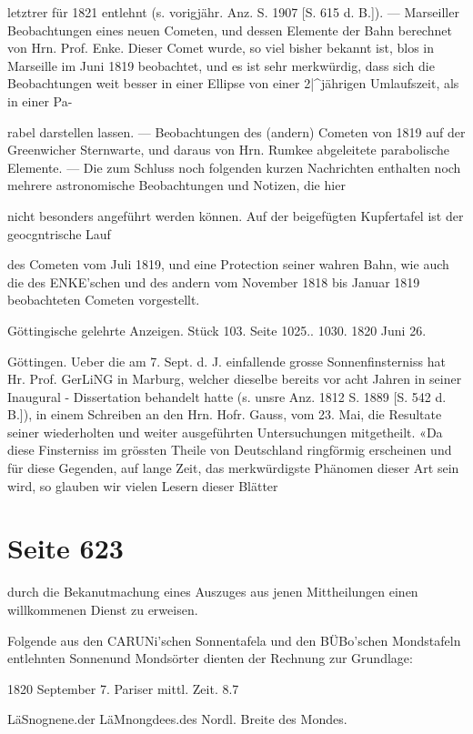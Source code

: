 \documentclass[10pt,a4paper]{article}
\begin{document}
letztrer für 1821 entlehnt (s. vorigjähr. Anz. S. 1907 [S. 615 d. B.]). — Marseiller Beobachtungen eines neuen Cometen, und dessen Elemente der Bahn berechnet von Hrn. Prof. Enke. Dieser Comet wurde, so viel bisher bekannt ist, blos in Marseille im Juni 1819 beobachtet, und es ist sehr merkwürdig, dass sich die Beobachtungen weit besser in einer Ellipse von einer 2|\textasciicircum{}jährigen Umlaufszeit, als in einer Pa-

rabel darstellen lassen. — Beobachtungen des (andern) Cometen von 1819 auf der Greenwicher Sternwarte, und daraus von Hrn. Rumkee abgeleitete parabolische Elemente. — Die zum Schluss noch folgenden kurzen Nachrichten enthalten noch mehrere astronomische Beobachtungen und Notizen, die hier

nicht besonders angeführt werden können. Auf der beigefügten Kupfertafel ist der geocgntrische Lauf

des Cometen vom Juli 1819, und eine Protection seiner wahren Bahn, wie auch die des ENKE'schen und des andern vom November 1818 bis Januar 1819 beobachteten Cometen vorgestellt.

Göttingische gelehrte Anzeigen. Stück 103. Seite 1025.. 1030. 1820 Juni 26.

Göttingen. Ueber die am 7. Sept. d. J. einfallende grosse Sonnenfinsterniss hat Hr. Prof. GerLiNG in Marburg, welcher dieselbe bereits vor acht Jahren in seiner Inaugural - Dissertation behandelt hatte (s. unsre Anz. 1812 S. 1889 [S. 542 d. B.]), in einem Schreiben an den Hrn. Hofr. Gauss, vom 23. Mai, die Resultate seiner wiederholten und weiter ausgeführten Untersuchungen mitgetheilt. «Da diese Finsterniss im grössten Theile von Deutschland ringförmig erscheinen und für diese Gegenden, auf lange Zeit, das merkwürdigste Phänomen dieser Art sein wird, so glauben wir vielen Lesern dieser Blätter


\newpage
\section*{Seite 623}
durch die Bekanutmachung eines Auszuges aus jenen Mittheilungen einen willkommenen Dienst zu erweisen.

Folgende aus den CARUNi'schen Sonnentafela und den BÜBo'schen Mondstafeln entlehnten Sonnenund Mondsörter dienten der Rechnung zur Grundlage:

1820 September 7. Pariser mittl. Zeit. 8.7

LäSnognene.der LäMnongdees.des Nordl. Breite des Mondes.
\end{document}
